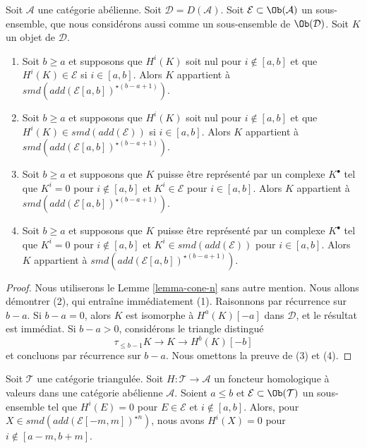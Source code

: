 \begin{lemma}
\label{lemma-in-cone-n}
Soit $\mathcal{A}$ une catégorie abélienne. Soit
$\mathcal{D} = D(\mathcal{A})$.
Soit $\mathcal{E} \subset \Ob(\mathcal{A})$ un sous-ensemble, que nous
considérons aussi comme un sous-ensemble de $\Ob(\mathcal{D})$.
Soit $K$ un objet de $\mathcal{D}$.
\begin{enumerate}
\item Soit $b \geq a$ et supposons que $H^i(K)$ soit nul pour
$i \not \in [a, b]$ et que $H^i(K) \in \mathcal{E}$ si
$i \in [a, b]$. Alors $K$ appartient à
$smd(add(\mathcal{E}[a, b])^{\star (b - a + 1)})$.
\item Soit $b \geq a$ et supposons que $H^i(K)$ soit nul pour
$i \not \in [a, b]$ et que $H^i(K) \in smd(add(\mathcal{E}))$ si
$i \in [a, b]$. Alors $K$ appartient à
$smd(add(\mathcal{E}[a, b])^{\star (b - a + 1)})$.
\item Soit $b \geq a$ et supposons que $K$ puisse être représenté par un
complexe $K^\bullet$ tel que $K^i = 0$ pour $i \not \in [a, b]$ et
$K^i \in \mathcal{E}$ pour $i \in [a, b]$. Alors $K$ appartient à
$smd(add(\mathcal{E}[a, b])^{\star (b - a + 1)})$.
\item Soit $b \geq a$ et supposons que $K$ puisse être représenté par un
complexe $K^\bullet$ tel que $K^i = 0$ pour $i \not \in [a, b]$ et
$K^i \in smd(add(\mathcal{E}))$ pour $i \in [a, b]$. Alors $K$ appartient à
$smd(add(\mathcal{E}[a, b])^{\star (b - a + 1)})$.
\end{enumerate}
\end{lemma}

\begin{proof}
Nous utiliserons le Lemme \ref{lemma-cone-n} sans autre mention.
Nous allons démontrer (2), qui entraîne immédiatement (1). Raisonnons par
récurrence sur $b - a$. Si $b - a = 0$, alors $K$ est isomorphe à
$H^a(K)[-a]$ dans $\mathcal{D}$, et le résultat est immédiat.
Si $b - a > 0$, considérons le triangle distingué
$$
\tau_{\leq b - 1}K \to K \to H^b(K)[-b]
$$
et concluons par récurrence sur $b - a$. Nous omettons la preuve de (3) et
(4).
\end{proof}

\begin{lemma}
\label{lemma-forward-cone-n}
Soit $\mathcal{T}$ une catégorie triangulée. Soit
$H : \mathcal{T} \to \mathcal{A}$ un foncteur homologique à valeurs dans une
catégorie abélienne $\mathcal{A}$.
Soient $a \leq b$ et $\mathcal{E} \subset \Ob(\mathcal{T})$ un sous-ensemble
tel que $H^i(E) = 0$ pour $E \in \mathcal{E}$ et $i \not \in [a, b]$.
Alors, pour $X \in smd(add(\mathcal{E}[-m, m])^{\star n})$, nous avons
$H^i(X) = 0$ pour $i \not \in [a - m, b + m]$.
\end{lemma}

